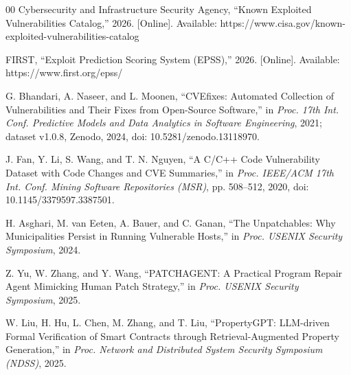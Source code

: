 ﻿\documentclass[lettersize,journal]{IEEEtran}
\begin{document}
\begin{thebibliography}{00}
Cybersecurity and Infrastructure Security Agency, ``Known Exploited Vulnerabilities Catalog,'' 2026. [Online]. Available: https://www.cisa.gov/known-exploited-vulnerabilities-catalog

FIRST, ``Exploit Prediction Scoring System (EPSS),'' 2026. [Online]. Available: https://www.first.org/epss/

G. Bhandari, A. Naseer, and L. Moonen, ``CVEfixes: Automated Collection of Vulnerabilities and Their Fixes from Open-Source Software,'' in \textit{Proc. 17th Int. Conf. Predictive Models and Data Analytics in Software Engineering}, 2021; dataset v1.0.8, Zenodo, 2024, doi: 10.5281/zenodo.13118970.

J. Fan, Y. Li, S. Wang, and T. N. Nguyen, ``A C/C++ Code Vulnerability Dataset with Code Changes and CVE Summaries,'' in \textit{Proc. IEEE/ACM 17th Int. Conf. Mining Software Repositories (MSR)}, pp. 508--512, 2020, doi: 10.1145/3379597.3387501.

H. Asghari, M. van Eeten, A. Bauer, and C. Ganan, ``The Unpatchables: Why Municipalities Persist in Running Vulnerable Hosts,'' in \textit{Proc. USENIX Security Symposium}, 2024.

Z. Yu, W. Zhang, and Y. Wang, ``PATCHAGENT: A Practical Program Repair Agent Mimicking Human Patch Strategy,'' in \textit{Proc. USENIX Security Symposium}, 2025.

W. Liu, H. Hu, L. Chen, M. Zhang, and T. Liu, ``PropertyGPT: LLM-driven Formal Verification of Smart Contracts through Retrieval-Augmented Property Generation,'' in \textit{Proc. Network and Distributed System Security Symposium (NDSS)}, 2025.

\end{thebibliography}
\end{document}
